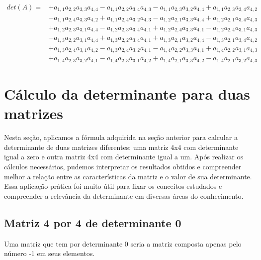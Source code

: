 \documentclass[12pt, a4paper]{article}
\begin{document}
\begin{equation*}
\begin{aligned}
det(A) = & + a_{ 1 , 1 }a_{ 2 , 2 }a_{ 3 , 3 }a_{ 4 , 4 } 
- a_{ 1 , 1 }a_{ 2 , 2 }a_{ 3 , 4 }a_{ 4 , 3 } 
- a_{ 1 , 1 }a_{ 2 , 3 }a_{ 3 , 2 }a_{ 4 , 4 } 
+ a_{ 1 , 1 }a_{ 2 , 3 }a_{ 3 , 4 }a_{ 4 , 2 } \\
& - a_{ 1 , 1 }a_{ 2 , 4 }a_{ 3 , 3 }a_{ 4 , 2 } 
+ a_{ 1 , 1 }a_{ 2 , 4 }a_{ 3 , 2 }a_{ 4 , 3 } 
- a_{ 1 , 2 }a_{ 2 , 1 }a_{ 3 , 3 }a_{ 4 , 4 } 
+ a_{ 1 , 2 }a_{ 2 , 1 }a_{ 3 , 4 }a_{ 4 , 3 } \\
& + a_{ 1 , 2 }a_{ 2 , 3 }a_{ 3 , 1 }a_{ 4 , 4 } 
- a_{ 1 , 2 }a_{ 2 , 3 }a_{ 3 , 4 }a_{ 4 , 1 } 
+ a_{ 1 , 2 }a_{ 2 , 4 }a_{ 3 , 3 }a_{ 4 , 1 } 
- a_{ 1 , 2 }a_{ 2 , 4 }a_{ 3 , 1 }a_{ 4 , 3 } \\
& - a_{ 1 , 3 }a_{ 2 , 2 }a_{ 3 , 1 }a_{ 4 , 4 } 
+ a_{ 1 , 3 }a_{ 2 , 2 }a_{ 3 , 4 }a_{ 4 , 1 } 
+ a_{ 1 , 3 }a_{ 2 , 1 }a_{ 3 , 2 }a_{ 4 , 4 } 
- a_{ 1 , 3 }a_{ 2 , 1 }a_{ 3 , 4 }a_{ 4 , 2 } \\
& + a_{ 1 , 3 }a_{ 2 , 4 }a_{ 3 , 1 }a_{ 4 , 2 } 
- a_{ 1 , 3 }a_{ 2 , 4 }a_{ 3 , 2 }a_{ 4 , 1 } 
- a_{ 1 , 4 }a_{ 2 , 2 }a_{ 3 , 3 }a_{ 4 , 1 } 
+ a_{ 1 , 4 }a_{ 2 , 2 }a_{ 3 , 1 }a_{ 4 , 3 } \\
& + a_{ 1 , 4 }a_{ 2 , 3 }a_{ 3 , 2 }a_{ 4 , 1 } 
- a_{ 1 , 4 }a_{ 2 , 3 }a_{ 3 , 1 }a_{ 4 , 2 } 
+ a_{ 1 , 4 }a_{ 2 , 1 }a_{ 3 , 3 }a_{ 4 , 2 } 
- a_{ 1 , 4 }a_{ 2 , 1 }a_{ 3 , 2 }a_{ 4 , 3 }
\end{aligned}
\end{equation*}

\section{Cálculo da determinante para duas matrizes}

Nesta seção, aplicamos a fórmula adquirida na seção anterior para calcular a determinante de duas matrizes diferentes: uma matriz 4x4 com determinante igual a zero e outra matriz 4x4 com determinante igual a um. Após realizar os cálculos necessários, pudemos interpretar os resultados obtidos e compreender melhor a relação entre as características da matriz e o valor de sua determinante. Essa aplicação prática foi muito útil para fixar os conceitos estudados e compreender a relevância da determinante em diversas áreas do conhecimento.
\subsection{Matriz 4 por 4 de determinante 0}
Uma matriz que tem por determinante 0 seria a matriz composta apenas pelo número -1 em seus elementos.
\end{document}
